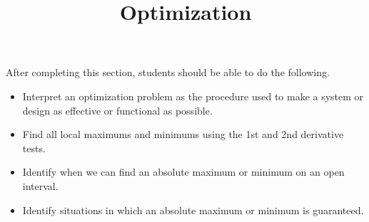 \documentclass{ximera}
\title{Optimization}
\begin{document}
\begin{abstract}
\end{abstract}

\maketitle

\begin{sectionOutcomes}

After completing this section, students should be able to do the following.

\begin{itemize}
	\item Interpret an optimization problem as the procedure used to make a system or design as effective or functional as possible.
	\item Find all local maximums and minimums using the 1st and 2nd derivative tests.
	\item Identify when we can find an absolute maximum or minimum on an open interval.
	\item Identify situations in which an absolute maximum or minimum is guaranteed.
\end{itemize}

\end{sectionOutcomes}
\end{document}
